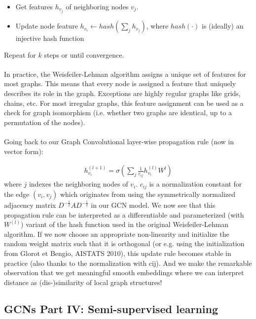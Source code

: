 \documentclass[12pt,a4paper]{article}
\begin{document}
\begin{itemize}
\item Get features $  h_{v_{j}}  $ of neighboring nodes $v_{j} $.
\item Update node feature $h_{v_{i}} \leftarrow hash(\sum_{j} h_{v_{j}})$, where $hash(\cdot)$ is (ideally) an injective hash function
\end{itemize}
Repeat for $k$ steps or until convergence.
\\ \\
In practice, the Weisfeiler-Lehman algorithm assigns a unique set of features for most graphs. This means that every node is assigned a feature that uniquely describes its role in the graph. Exceptions are highly regular graphs like grids, chains, etc. For most irregular graphs, this feature assignment can be used as a check for graph isomorphism (i.e. whether two graphs are identical, up to a permutation of the nodes).
\\ \\
Going back to our Graph Convolutional layer-wise propagation rule (now in vector form):

\begin{align*}
h_{v_{i}}^{(l+1)} = \sigma \left( \sum_{j} \frac{1}{c_{ij}} h_{v_{i}}^{(l)}W^{l}  \right)
\end{align*}
where $j$ indexes the neighboring nodes of $v_{i}$. $c_{ij}$ is a normalization constant for the edge $(v_{i},v_{j})$ which originates from using the symmetrically normalized adjacency matrix $D^{-\frac{1}{2}}AD^{-\frac{1}{2}}$ in our GCN model. We now see that this propagation rule can be interpreted as a differentiable and parameterized (with $W^{(l)}$) variant of the hash function used in the original Weisfeiler-Lehman algorithm. If we now choose an appropriate non-linearity and initialize the random weight matrix such that it is orthogonal (or e.g. using the initialization from Glorot et Bengio, AISTATS 2010), this update rule becomes stable in practice (also thanks to the normalization with cij). And we make the remarkable observation that we get meaningful smooth embeddings where we can interpret distance as (dis-)similarity of local graph structures!

\subsection*{GCNs Part IV: Semi-supervised learning}
\end{document}
